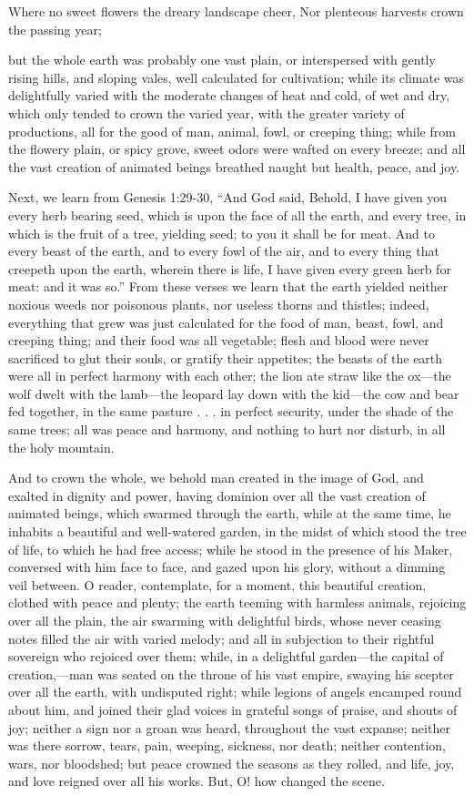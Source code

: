 Where no sweet flowers the dreary landscape cheer, Nor plenteous harvests crown the
passing year;

but the whole earth was probably one vast plain, or interspersed with gently rising hills, and
sloping vales, well calculated for cultivation; while its climate was delightfully varied with
the moderate changes of heat and cold, of wet and dry, which only tended to crown the
varied year, with the greater variety of productions, all for the good of man, animal, fowl, or
creeping thing; while from the flowery plain, or spicy grove, sweet odors were wafted on
every breeze; and all the vast creation of animated beings breathed naught but health, peace,
and joy.

Next, we learn from Genesis 1:29-30, ``And God said, Behold, I have given you every herb
bearing seed, which is upon the face of all the earth, and every tree, in which is the fruit of a
tree, yielding seed; to you it shall be for meat. And to every beast of the earth, and to every
fowl of the air, and to every thing that creepeth upon the earth, wherein there is life, I have
given every green herb for meat: and it was so.'' From these verses we learn that the earth
yielded neither noxious weeds nor poisonous plants, nor useless thorns and thistles; indeed,
everything that grew was just calculated for the food of man, beast, fowl, and creeping thing;
and their food was all vegetable; flesh and blood were never sacrificed to glut their souls, or
gratify their appetites; the beasts of the earth were all in perfect harmony with each other; the
lion ate straw like the ox—the wolf dwelt with the lamb—the leopard lay down with the
kid—the cow and bear fed together, in the same pasture . . . in perfect security, under the
shade of the same trees; all was peace and harmony, and nothing to hurt nor disturb, in all the
holy mountain.

And to crown the whole, we behold man created in the image of God, and exalted in dignity
and power, having dominion over all the vast creation of animated beings, which swarmed
through the earth, while at the same time, he inhabits a beautiful and well-watered garden, in
the midst of which stood the tree of life, to which he had free access; while he stood in the
presence of his Maker, conversed with him face to face, and gazed upon his glory, without a
dimming veil between. O reader, contemplate, for a moment, this beautiful creation, clothed
with peace and plenty; the earth teeming with harmless animals, rejoicing over all the plain,
the air swarming with delightful birds, whose never ceasing notes filled the air with varied
melody; and all in subjection to their rightful sovereign who rejoiced over them; while, in a
delightful garden—the capital of creation,—man was seated on the throne of his vast empire,
swaying his scepter over all the earth, with undisputed right; while legions of angels
encamped round about him, and joined their glad voices in grateful songs of praise, and
shouts of joy; neither a sign nor a groan was heard, throughout the vast expanse; neither was
there sorrow, tears, pain, weeping, sickness, nor death; neither contention, wars, nor
bloodshed; but peace crowned the seasons as they rolled, and life, joy, and love reigned over
all his works. But, O! how changed the scene.

